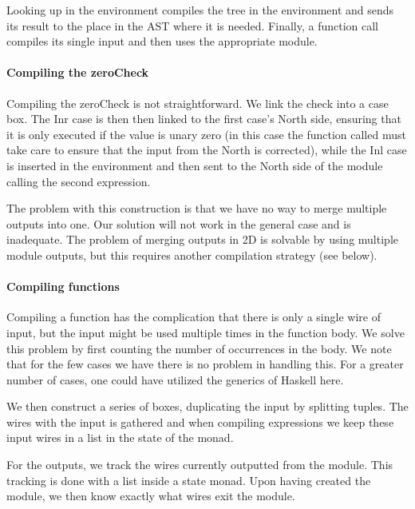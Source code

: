 Looking up in the environment compiles the tree in the environment and
sends its result to the place in the AST where it is needed. Finally,
a function call compiles its single input and then uses the
appropriate module.

\paragraph{Compiling the zeroCheck}
\label{sec:compiling-zerochk}

Compiling the zeroCheck is not straightforward. We link the check
into a case box. The Inr case is then then linked to the first case's
North side, ensuring that it is only executed if the value is unary
zero (in this case the function called must take care to ensure that
the input from the North is corrected), while the Inl case is inserted
in the environment and then sent to the North side of the module
calling the second expression.

The problem with this construction is that we have no way to merge
multiple outputs into one. Our solution will not work in the general
case and is inadequate. The problem of merging outputs in 2D is
solvable by using multiple module outputs, but this requires another
compilation strategy (see below).

\paragraph{Compiling functions}
\label{sec:compiling-functions}

Compiling a function has the complication that there is only a single
wire of input, but the input might be used multiple times in the
function body. We solve this problem by first counting the number of
occurrences in the body. We note that for the few cases we have there
is no problem in handling this. For a greater number of cases, one could
have utilized the generics of Haskell here.

We then construct a series of boxes, duplicating the input by
splitting tuples. The wires with the input is gathered and when
compiling expressions we keep these input wires in a list in the state
of the monad.

For the outputs, we track the wires currently outputted from the
module. This tracking is done with a list inside a state monad. Upon
having created the module, we then know exactly what wires exit the
module.



